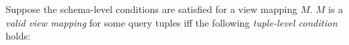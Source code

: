 \begin{definition}
\begin{enumerate}
\begin{enumerate}



\end{enumerate}
\end{enumerate}
\end{definition}

Suppose the schema-level conditions are satisfied for a view mapping $M$. $M$ is a {\em valid view mapping} for some query tuples iff the following {\em tuple-level condition} holds:

